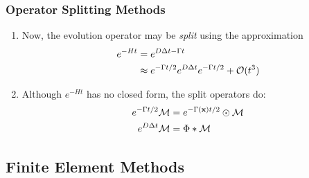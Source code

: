 \begin{frame}
\frametitle{Operator Splitting Methods}
\begin{enumerate}
    \item Now, the evolution operator may be \textit{split} using the approximation %
    \begin{align*}
        e^{-Ht} &= e^{D \Delta t - \Gamma t} \\
        &\approx e^{-\Gamma t/2} e^{D \Delta t} e^{-\Gamma t/2} + \mathcal{O}(t^3)
    \end{align*}
    \pause
    \item Although $e^{-Ht}$ has no closed form, the split operators do:
    \begin{align*}
        e^{-\Gamma t/2} \mathcal{M} &= e^{-\Gamma(\mathbf{x}) t/2} \odot \mathcal{M} \\
        e^{D \Delta t} \mathcal{M} &= \Phi \ast \mathcal{M}
    \end{align*}
\end{enumerate}
\end{frame}

\subsection{Finite Element Methods}

